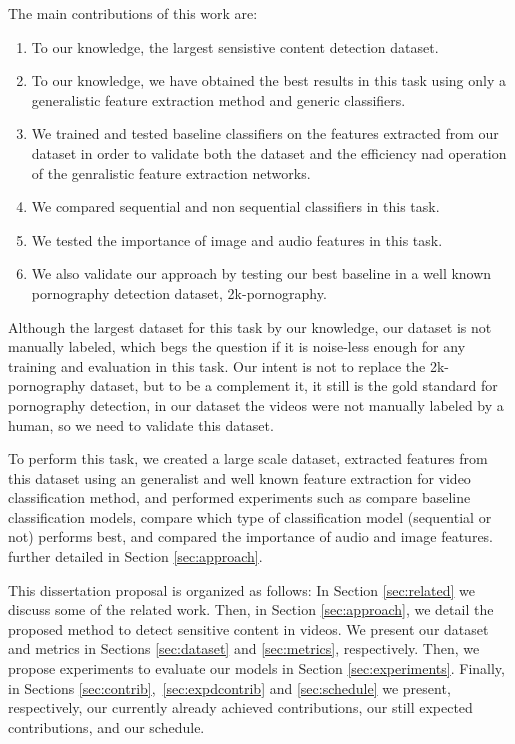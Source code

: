 The main contributions of this work are:
\begin{enumerate}
    \item To our knowledge, the largest sensistive content detection dataset.
    \item To our knowledge, we have obtained the best results in this task using only a generalistic feature extraction method and generic classifiers.
    \item We trained and tested baseline classifiers on the features extracted from our dataset in order to validate both the dataset and the efficiency nad operation of the genralistic feature extraction networks.  
    \item We compared sequential and non sequential classifiers in this task.
    \item We tested the importance of image and audio features in this task.
    \item We also validate our approach by testing our best baseline in a well known pornography detection dataset, 2k-pornography. 
\end{enumerate}
Although the largest dataset for this task by our knowledge, our dataset is not manually labeled, which begs the question if it is noise-less enough for any training and evaluation in this task.  
Our intent is not to replace the 2k-pornography dataset, but to be a complement it, it still is the gold standard for pornography detection, in our dataset the videos were not manually labeled by a human, so we need to validate this dataset.

To perform this task, we created a large scale dataset, extracted features from this dataset using an generalist and well known feature extraction for video classification method, and performed experiments such as compare baseline classification models, compare which type of classification model (sequential or not) performs best, and compared the importance of audio and image features. further detailed in Section \ref{sec:approach}.

This dissertation proposal is organized as follows:
In Section \ref{sec:related} we discuss some of the related work.
Then, in Section \ref{sec:approach}, we detail the proposed method to detect sensitive content in videos.
We present our dataset and metrics in Sections \ref{sec:dataset} and \ref{sec:metrics}, respectively.
Then, we propose experiments to evaluate our models in Section \ref{sec:experiments}.
Finally, in Sections \ref{sec:contrib},~\ref{sec:expdcontrib} and \ref{sec:schedule} we present, respectively, our currently already achieved contributions, our still expected contributions, and our schedule.